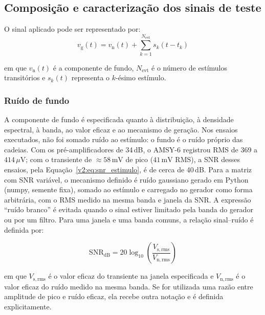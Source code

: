 \subsection{Composição e caracterização dos sinais de teste}
\label{v2:subsec:sinais_teste}

O sinal aplicado pode ser representado por:
\begin{equation}
	v_{\mathrm{g}}(t) = v_{\mathrm{n}}(t) + \sum_{k=1}^{N_{\mathrm{evt}}} s_k\left(t-t_k\right)
	\label{v2:eq:sinal_teste_composto}
\end{equation}

\noindent
em que \(v_{\mathrm{n}}(t)\) é a componente de fundo, \(N_{\mathrm{evt}}\) é o número de estímulos transitórios e \(s_k(t)\) representa o \(k\)-ésimo estímulo.

\subsubsection{Ruído de fundo}
A componente de fundo é especificada quanto à distribuição, à densidade espectral, à banda, ao valor eficaz e ao mecanismo de geração. Nos ensaios executados, não foi somado ruído ao estímulo: o fundo é o ruído próprio das cadeias. Com os pré-amplificadores de 34\,dB, o AMSY-6 registrou RMS de 369 a \(414\,\mu\mathrm{V}\); com o transiente de \(\approx 58\,\mathrm{mV}\) de pico (\(41\,\mathrm{mV}\) RMS), a SNR desses ensaios, pela Equação~\eqref{v2:eq:snr_estimulo}, é de cerca de 40\,dB. Para a matriz com SNR variável, o mecanismo definido é ruído gaussiano gerado em Python (numpy, semente fixa), somado ao estímulo e carregado no gerador como forma arbitrária, com o RMS medido na mesma banda e janela da SNR. A expressão ``ruído branco'' é evitada quando o sinal estiver limitado pela banda do gerador ou por um filtro. Para uma janela e uma banda comuns, a relação sinal--ruído é definida por:

\begin{equation}
	\mathrm{SNR}_{\mathrm{dB}} = 20\log_{10} \left(\frac{V_{\mathrm{s,rms}}}{V_{\mathrm{n,rms}}}\right)
	\label{v2:eq:snr_estimulo}
\end{equation}

\noindent
em que \(V_{\mathrm{s,rms}}\) é o valor eficaz do transiente na janela especificada e \(V_{\mathrm{n,rms}}\) é o valor eficaz do ruído medido na mesma banda. Se for utilizada uma razão entre amplitude de pico e ruído eficaz, ela recebe outra notação e é definida explicitamente.

